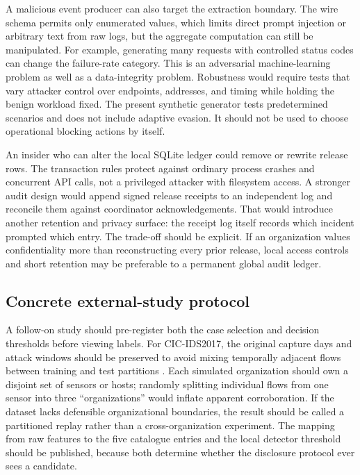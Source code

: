 A malicious event producer can also target the extraction boundary. The wire schema permits only enumerated values, which limits direct prompt injection or arbitrary text from raw logs, but the aggregate computation can still be manipulated. For example, generating many requests with controlled status codes can change the failure-rate category. This is an adversarial machine-learning problem as well as a data-integrity problem. Robustness would require tests that vary attacker control over endpoints, addresses, and timing while holding the benign workload fixed. The present synthetic generator tests predetermined scenarios and does not include adaptive evasion. It should not be used to choose operational blocking actions by itself.

An insider who can alter the local SQLite ledger could remove or rewrite release rows. The transaction rules protect against ordinary process crashes and concurrent API calls, not a privileged attacker with filesystem access. A stronger audit design would append signed release receipts to an independent log and reconcile them against coordinator acknowledgements. That would introduce another retention and privacy surface: the receipt log itself records which incident prompted which entry. The trade-off should be explicit. If an organization values confidentiality more than reconstructing every prior release, local access controls and short retention may be preferable to a permanent global audit ledger.

\subsection{Concrete external-study protocol}
A follow-on study should pre-register both the case selection and decision thresholds before viewing labels. For CIC-IDS2017, the original capture days and attack windows should be preserved to avoid mixing temporally adjacent flows between training and test partitions \cite{cicdata,cicpaper}. Each simulated organization should own a disjoint set of sensors or hosts; randomly splitting individual flows from one sensor into three ``organizations'' would inflate apparent corroboration. If the dataset lacks defensible organizational boundaries, the result should be called a partitioned replay rather than a cross-organization experiment. The mapping from raw features to the five catalogue entries and the local detector threshold should be published, because both determine whether the disclosure protocol ever sees a candidate.

